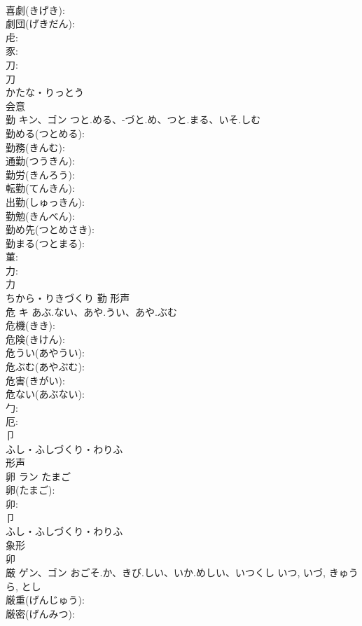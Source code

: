 \documentclass[8pt]{extreport}
\begin{document}
\begin{CJK}{UTF8}{min}
\\	喜劇(きげき): 
\\	劇団(げきだん): 
\\	虍: 
\\	豕: 
\\	刀: 
\\	刀	
\\	かたな・りっとう	
\\	会意 
\\	勤	キン、ゴン	つと.める、-づと.め、つと.まる、いそ.しむ		
\\	勤める(つとめる): 
\\	勤務(きんむ): 
\\	通勤(つうきん): 
\\	勤労(きんろう): 
\\	転勤(てんきん): 
\\	出勤(しゅっきん): 
\\	勤勉(きんべん): 
\\	勤め先(つとめさき): 
\\	勤まる(つとまる): 
\\	菫: 
\\	力: 
\\	力	
\\	ちから・りきづくり	勤	形声 
\\	危	キ	あぶ.ない、あや.うい、あや.ぶむ		
\\	危機(きき): 
\\	危険(きけん): 
\\	危うい(あやうい): 
\\	危ぶむ(あやぶむ): 
\\	危害(きがい): 
\\	危ない(あぶない): 
\\	勹: 
\\	厄: 
\\	卩	
\\	ふし・ふしづくり・わりふ	
\\	形声 
\\	卵	ラン	たまご		
\\	卵(たまご): 
\\	卯: 
\\	卩	
\\	ふし・ふしづくり・わりふ	
\\	象形 
\\	卯
\\	厳	ゲン、ゴン	おごそ.か、きび.しい、いか.めしい、いつくし	いつ, いづ, きゅうら, とし	
\\	厳重(げんじゅう): 
\\	厳密(げんみつ): 

\end{CJK}
\end{document}

